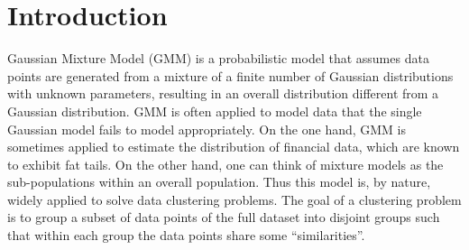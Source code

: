 \documentclass[10pt,journal,compsoc]{IEEEtran}
\begin{document}
%
\IEEEpeerreviewmaketitle


\ifCLASSOPTIONcompsoc
{}
\else
\section{Introduction}
\label{sec:introduction}
\fi
 Gaussian Mixture Model (GMM) is a probabilistic model that assumes data points are generated from a mixture of a finite number of Gaussian distributions with unknown parameters\cite{bishop2006pattern}, resulting in an overall distribution different from a Gaussian distribution. GMM is often applied to model data that the single Gaussian model fails to model appropriately. On the one hand, GMM is sometimes applied to estimate the distribution of financial data\cite{dinov2008expectation}, which are known to exhibit fat tails. On the other hand, one can think of mixture models as the sub-populations within an overall population. Thus this model is, by nature, widely applied to solve data clustering problems\cite{hou2014novel}\cite{lu2019gmm}\cite{su2007search}. The goal of a clustering problem is to group a subset of data points of the full dataset into disjoint groups such that within each group the data points share some ``similarities''.
\end{document}
